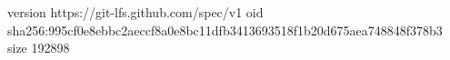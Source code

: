 version https://git-lfs.github.com/spec/v1
oid sha256:995cf0e8ebbc2aeccf8a0e8bc11dfb3413693518f1b20d675aea748848f378b3
size 192898
